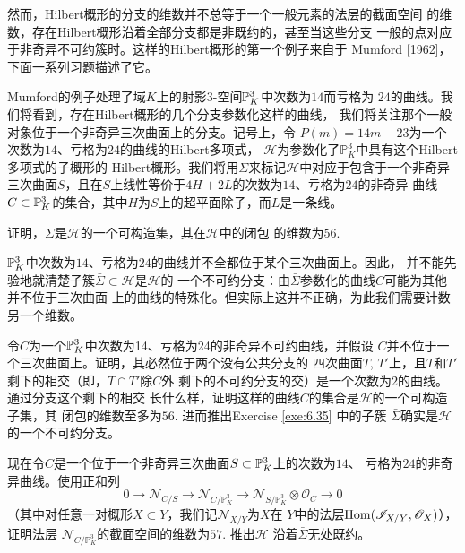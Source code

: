 然而，Hilbert概形的分支的维数并不总等于一个一般元素的法层的截面空间
的维数，存在Hilbert概形沿着全部分支都是非既约的，甚至当这些分支
一般的点对应于非奇异不可约簇时。这样的Hilbert概形的第一个例子来自于
Mumford [1962]，下面一系列习题描述了它。

Mumford的例子处理了域$K$上的射影$3$-空间$\P_K^3$中次数为$14$而亏格为
$24$的曲线。我们将看到，存在Hilbert概形的几个分支参数化这样的曲线，
我们将关注那个一般对象位于一个非奇异三次曲面上的分支。记号上，令
$P(m)=14m-23$为一个次数为$14$、亏格为$24$的曲线的Hilbert多项式，
$\mathscr H$为参数化了$\mathbb P_K^3$中具有这个Hilbert多项式的子概形的
Hilbert概形。我们将用$\Sigma$来标记$\mathscr H$中对应于包含于一个非奇异
三次曲面$S$，且在$S$上线性等价于$4H+2L$的次数为$14$、亏格为$24$的非奇异
曲线$C\subset \P_K^3$的集合，其中$H$为$S$上的超平面除子，而$L$是一条线。

\begin{exe}\label{exe:6.35}
证明，$\Sigma$是$\mathscr H$的一个可构造集，其在$\mathscr H$中的闭包
的维数为$56$.
\end{exe}

$\P_K^3$中次数为$14$、亏格为$24$的曲线并不全都位于某个三次曲面上。因此，
并不能先验地就清楚子簇$\bar \Sigma\subset \mathscr H$是$\mathscr H$的
一个不可约分支：由$\bar\Sigma$参数化的曲线$C$可能为其他并不位于三次曲面
上的曲线的特殊化。但实际上这并不正确，为此我们需要计数另一个维数。

\begin{exe}\label{exe:6.36}
令$C$为一个$\P_K^3$中次数为14、亏格为24的非奇异不可约曲线，并假设
$C$并不位于一个三次曲面上。证明，其必然位于两个没有公共分支的
四次曲面$T$, $T'$上，且$T$和$T'$剩下的相交（即，$T\cap T'$除$C$外
剩下的不可约分支的交）是一个次数为$2$的曲线。通过分支这个剩下的相交
长什么样，证明这样的曲线$C$的集合是$\mathscr H$的一个可构造子集，其
闭包的维数至多为$56$. 进而推出Exercise \ref{exe:6.35} 中的子簇
$\bar\Sigma$确实是$\mathscr H$的一个不可约分支。
\end{exe}


\begin{exe}\label{exe:6.37}
现在令$C$是一个位于一个非奇异三次曲面$S\subset \P_K^3$上的次数为$14$、
亏格为$24$的非奇异曲线。使用正和列
\[
    0 \to \mathscr{N}_{C/S} \to \mathscr{N}_{C/\mathbb{P}_{K}^{3}} 
    \to \mathscr{N}_{S/\mathbb{P}_{K}^{3}} \otimes \mathscr{O}_{C} 
    \to 0
\]
（其中对任意一对概形$X\subset Y$，我们记$\mathscr N_{X/Y}$为$X$在
$Y$中的法层$\Hom(\mathscr I_{X/Y},\mathscr O_X)$），证明法层
$\mathscr N_{C/\mathbb P_K^3}$的截面空间的维数为$57$. 推出$\mathscr H$
沿着$\bar\Sigma$无处既约。
\end{exe}


